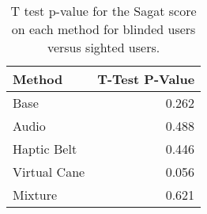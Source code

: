
\begin{table}[!htb]
\centering
\caption{T test p-value for the Sagat score on each method for blinded users versus sighted users.}
\label{tab:ttest_sagat_score}
\begin{tabular}{lr}
\toprule
      Method &  T-Test P-Value \\
\midrule
        Base &           0.262 \\
       Audio &           0.488 \\
 Haptic Belt &           0.446 \\
Virtual Cane &           0.056 \\
     Mixture &           0.621 \\
\bottomrule
\end{tabular}
\end{table}

